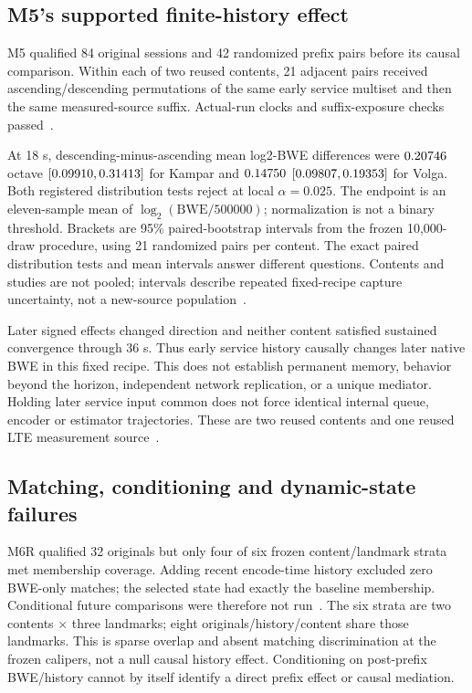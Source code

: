 \documentclass[10pt]{article}
\begin{document}
\subsection{M5's supported finite-history effect}
M5 qualified 84 original sessions and 42 randomized prefix pairs before its causal
comparison. Within each of two reused contents, 21 adjacent pairs received
ascending/descending permutations of the same early service multiset and then
the same measured-source suffix. Actual-run clocks and suffix-exposure checks
passed~\cite{m5}.

At 18 s, descending-minus-ascending mean log2-BWE differences were
$0.20746{}$ octave $[0.09910{},0.31413{}]$ for Kampar and
$0.14750{}$ $[0.09807{},0.19353{}]$ for Volga.
Both registered distribution tests reject at local $\alpha=0.025$. The endpoint
is an eleven-sample mean of $\log_2(\mathrm{BWE}/500000)$; normalization is not a
binary threshold. Brackets are 95\% paired-bootstrap intervals from the frozen
10,000-draw procedure, using 21 randomized pairs per content. The exact paired
distribution tests and mean intervals answer different questions. Contents and
studies are not pooled; intervals describe repeated fixed-recipe capture
uncertainty, not a new-source population~\cite{m5}.

Later signed effects changed direction and neither content satisfied sustained
convergence through 36 s. Thus early service history causally changes later native
BWE in this fixed recipe. This does not establish permanent memory, behavior
beyond the horizon, independent network replication, or a unique mediator.
Holding later service input common does not force identical internal queue,
encoder or estimator trajectories. These are two reused contents and one reused
LTE measurement source~\cite{m5}.

\subsection{Matching, conditioning and dynamic-state failures}
M6R qualified 32 originals but only four of six frozen content/landmark strata
met membership coverage. Adding recent encode-time history excluded zero
BWE-only matches; the selected state had exactly the baseline membership.
Conditional future comparisons were therefore not run~\cite{m6r}. The six strata
are two contents $\times$ three landmarks; eight originals/history/content
share those landmarks. This is sparse overlap and absent matching discrimination
at the frozen calipers, not a null causal history effect. Conditioning on
post-prefix BWE/history cannot by itself identify a direct prefix effect or
causal mediation.
\end{document}
